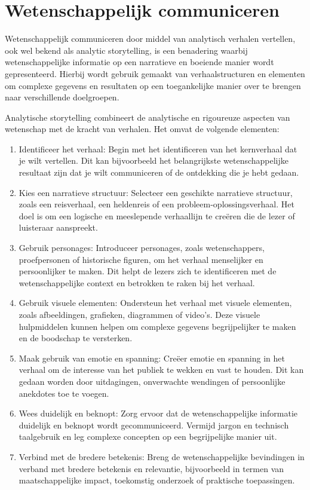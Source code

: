 \documentclass[
  letterpaper,
  DIV=11,
  numbers=noendperiod]{scrreprt}
\providecommand{\tightlist}{%
  \setlength{\itemsep}{0pt}\setlength{\parskip}{0pt}}\usepackage{longtable,booktabs,array}
\begin{document}
\hypertarget{wetenschappelijk-communiceren}{%
\section{Wetenschappelijk
communiceren}\label{wetenschappelijk-communiceren}}

Wetenschappelijk communiceren door middel van analytisch verhalen
vertellen, ook wel bekend als analytic storytelling, is een benadering
waarbij wetenschappelijke informatie op een narratieve en boeiende
manier wordt gepresenteerd. Hierbij wordt gebruik gemaakt van
verhaalstructuren en elementen om complexe gegevens en resultaten op een
toegankelijke manier over te brengen naar verschillende doelgroepen.

Analytische storytelling combineert de analytische en rigoureuze
aspecten van wetenschap met de kracht van verhalen. Het omvat de
volgende elementen:

\begin{enumerate}
\def\labelenumi{\arabic{enumi}.}
\tightlist
\item
  Identificeer het verhaal: Begin met het identificeren van het
  kernverhaal dat je wilt vertellen. Dit kan bijvoorbeeld het
  belangrijkste wetenschappelijke resultaat zijn dat je wilt
  communiceren of de ontdekking die je hebt gedaan.
\item
  Kies een narratieve structuur: Selecteer een geschikte narratieve
  structuur, zoals een reisverhaal, een heldenreis of een
  probleem-oplossingsverhaal. Het doel is om een logische en meeslepende
  verhaallijn te creëren die de lezer of luisteraar aanspreekt.
\item
  Gebruik personages: Introduceer personages, zoals wetenschappers,
  proefpersonen of historische figuren, om het verhaal menselijker en
  persoonlijker te maken. Dit helpt de lezers zich te identificeren met
  de wetenschappelijke context en betrokken te raken bij het verhaal.
\item
  Gebruik visuele elementen: Ondersteun het verhaal met visuele
  elementen, zoals afbeeldingen, grafieken, diagrammen of video's. Deze
  visuele hulpmiddelen kunnen helpen om complexe gegevens begrijpelijker
  te maken en de boodschap te versterken.
\item
  Maak gebruik van emotie en spanning: Creëer emotie en spanning in het
  verhaal om de interesse van het publiek te wekken en vast te houden.
  Dit kan gedaan worden door uitdagingen, onverwachte wendingen of
  persoonlijke anekdotes toe te voegen.
\item
  Wees duidelijk en beknopt: Zorg ervoor dat de wetenschappelijke
  informatie duidelijk en beknopt wordt gecommuniceerd. Vermijd jargon
  en technisch taalgebruik en leg complexe concepten op een
  begrijpelijke manier uit.
\item
  Verbind met de bredere betekenis: Breng de wetenschappelijke
  bevindingen in verband met bredere betekenis en relevantie,
  bijvoorbeeld in termen van maatschappelijke impact, toekomstig
  onderzoek of praktische toepassingen.
\end{enumerate}
\end{document}
